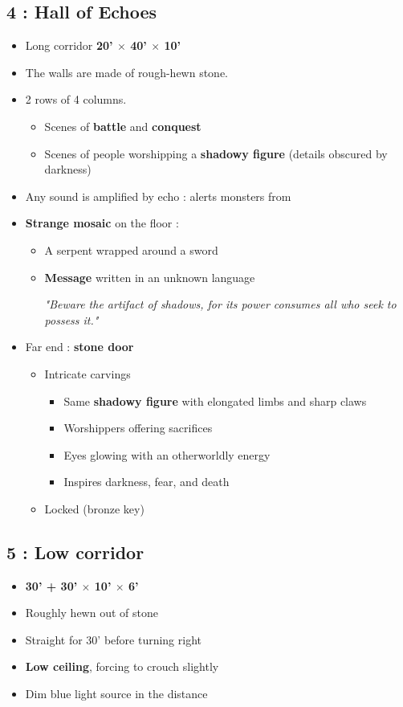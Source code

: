 \subsection{4 : Hall of Echoes}\label{l1:r4}
\begin{itemize}
  \item Long corridor \textbf{20' $\times$ 40' $\times$ 10'}
  \item The walls are made of rough-hewn stone.
  \item 2 rows of 4 columns.
  \begin{itemize}
    \item Scenes of \textbf{battle} and \textbf{conquest}
    \item Scenes of people worshipping a \textbf{shadowy figure} (details obscured by darkness)
  \end{itemize}
  \item Any sound is amplified by echo :
    alerts monsters from \textbf{}
  \item \textbf{Strange mosaic} on the floor :
  \begin{itemize}
    \item A serpent wrapped around a sword
    \item \textbf{Message} written in an unknown language
    \begin{highlight}
      \emph{"Beware the artifact of shadows, for its power consumes all who seek to possess it."}
    \end{highlight}
  \end{itemize}
  \item Far end : \textbf{stone door}
  \begin{itemize}
    \item Intricate carvings
    \begin{itemize}
      \item Same \textbf{shadowy figure} with elongated limbs and sharp claws
      \item Worshippers offering sacrifices
      \item Eyes glowing with an otherworldly energy
      \item Inspires darkness, fear, and death
    \end{itemize}
    \item Locked (bronze key)
  \end{itemize}
\end{itemize}

\subsection{5 : Low corridor}\label{l1:r5}
\begin{itemize}
    \item \textbf{30' + 30' $\times$ 10' $\times$ 6'}
    \item Roughly hewn out of stone
    \item Straight for 30' before turning right
    \item \textbf{Low ceiling}, forcing to crouch slightly
    \item Dim blue light source in the distance
\end{itemize}

